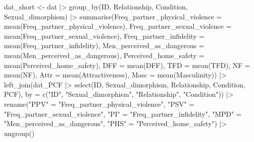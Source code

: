 \documentclass[
  bookmarksnumbered]{article}
\newenvironment{Shaded}{\begin{snugshade}}{\end{snugshade}}
\newcommand{\AttributeTok}[1]{\textcolor[rgb]{0.80,0.80,0.80}{#1}}
\newcommand{\FunctionTok}[1]{\textcolor[rgb]{0.94,0.94,0.56}{#1}}
\newcommand{\NormalTok}[1]{\textcolor[rgb]{0.80,0.80,0.80}{#1}}
\newcommand{\OtherTok}[1]{\textcolor[rgb]{0.94,0.94,0.56}{#1}}
\newcommand{\SpecialCharTok}[1]{\textcolor[rgb]{0.86,0.64,0.64}{#1}}
\newcommand{\StringTok}[1]{\textcolor[rgb]{0.80,0.58,0.58}{#1}}
\begin{document}
\begin{Shaded}
\begin{Highlighting}[]
\NormalTok{dat\_short }\OtherTok{\textless{}{-}}\NormalTok{ dat }\SpecialCharTok{|\textgreater{}} 
  \FunctionTok{group\_by}\NormalTok{(ID, Relationship, Condition, Sexual\_dimorphism) }\SpecialCharTok{|\textgreater{}} 
  \FunctionTok{summarise}\NormalTok{(}\AttributeTok{Freq\_partner\_physical\_violence =} \FunctionTok{mean}\NormalTok{(Freq\_partner\_physical\_violence),}
            \AttributeTok{Freq\_partner\_sexual\_violence =} \FunctionTok{mean}\NormalTok{(Freq\_partner\_sexual\_violence), }
            \AttributeTok{Freq\_partner\_infidelity =} \FunctionTok{mean}\NormalTok{(Freq\_partner\_infidelity),}
            \AttributeTok{Men\_perceived\_as\_dangerous =} \FunctionTok{mean}\NormalTok{(Men\_perceived\_as\_dangerous),}
            \AttributeTok{Perceived\_home\_safety =} \FunctionTok{mean}\NormalTok{(Perceived\_home\_safety),}
            \AttributeTok{DFF =} \FunctionTok{mean}\NormalTok{(DFF),}
            \AttributeTok{TFD =} \FunctionTok{mean}\NormalTok{(TFD),}
            \AttributeTok{NF =} \FunctionTok{mean}\NormalTok{(NF),}
            \AttributeTok{Attr =} \FunctionTok{mean}\NormalTok{(Attractiveness),}
            \AttributeTok{Masc =} \FunctionTok{mean}\NormalTok{(Masculinity)) }\SpecialCharTok{|\textgreater{}} 
  \FunctionTok{left\_join}\NormalTok{(dat\_PCF }\SpecialCharTok{|\textgreater{}} 
              \FunctionTok{select}\NormalTok{(ID, Sexual\_dimorphism, Relationship, Condition, PCF), }
            \AttributeTok{by =} \FunctionTok{c}\NormalTok{(}\StringTok{"ID"}\NormalTok{, }\StringTok{"Sexual\_dimorphism"}\NormalTok{, }\StringTok{"Relationship"}\NormalTok{, }\StringTok{"Condition"}\NormalTok{)) }\SpecialCharTok{|\textgreater{}} 
  \FunctionTok{rename}\NormalTok{(}\StringTok{"PPV"} \OtherTok{=} \StringTok{"Freq\_partner\_physical\_violence"}\NormalTok{,}
         \StringTok{"PSV"} \OtherTok{=} \StringTok{"Freq\_partner\_sexual\_violence"}\NormalTok{,      }
         \StringTok{"PI"} \OtherTok{=}  \StringTok{"Freq\_partner\_infidelity"}\NormalTok{,}
         \StringTok{"MPD"} \OtherTok{=} \StringTok{"Men\_perceived\_as\_dangerous"}\NormalTok{,}
         \StringTok{"PHS"} \OtherTok{=} \StringTok{"Perceived\_home\_safety"}\NormalTok{) }\SpecialCharTok{|\textgreater{}} 
  \FunctionTok{ungroup}\NormalTok{()}


\end{Highlighting}
\end{Shaded}
\end{document}
